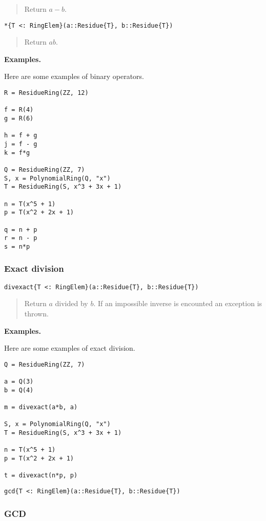 \documentclass[a4paper,10pt]{article}
\newcommand{\desc}[1]{\vspace{-3mm}\begin{quote}#1\end{quote}}
\begin{document}
\desc{Return $a - b$.}

\begin{lstlisting}
*{T <: RingElem}(a::Residue{T}, b::Residue{T})
\end{lstlisting}

\desc{Return $ab$.}

\textbf{Examples.}

Here are some examples of binary operators.

\begin{lstlisting}
R = ResidueRing(ZZ, 12)

f = R(4)
g = R(6)

h = f + g
j = f - g
k = f*g

Q = ResidueRing(ZZ, 7)
S, x = PolynomialRing(Q, "x")
T = ResidueRing(S, x^3 + 3x + 1)

n = T(x^5 + 1)
p = T(x^2 + 2x + 1)

q = n + p
r = n - p
s = n*p
\end{lstlisting}

\subsubsection{Exact division}

\begin{lstlisting}
divexact{T <: RingElem}(a::Residue{T}, b::Residue{T})
\end{lstlisting}

\desc{Return $a$ divided by $b$. If an impossible inverse is encounted
an exception is thrown.}

\textbf{Examples.}

Here are some examples of exact division.

\begin{lstlisting}
Q = ResidueRing(ZZ, 7)

a = Q(3)
b = Q(4)

m = divexact(a*b, a)

S, x = PolynomialRing(Q, "x")
T = ResidueRing(S, x^3 + 3x + 1)

n = T(x^5 + 1)
p = T(x^2 + 2x + 1)

t = divexact(n*p, p)
\end{lstlisting}

\begin{lstlisting}
gcd{T <: RingElem}(a::Residue{T}, b::Residue{T})
\end{lstlisting}

\subsubsection{GCD}
\end{document}
